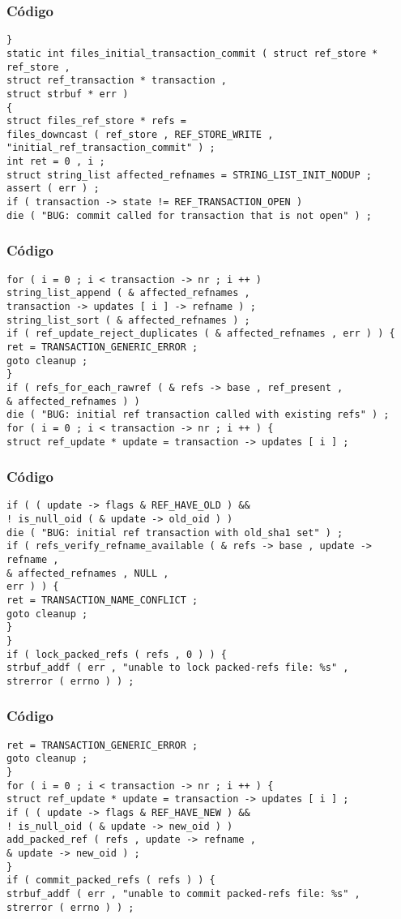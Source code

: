 \documentclass{beamer}
\begin{document}
\begin{frame}[fragile]
\frametitle{C\'odigo}
\begin{verbatim}
} 
static int files_initial_transaction_commit ( struct ref_store * ref_store , 
struct ref_transaction * transaction , 
struct strbuf * err ) 
{ 
struct files_ref_store * refs = 
files_downcast ( ref_store , REF_STORE_WRITE , 
"initial_ref_transaction_commit" ) ; 
int ret = 0 , i ; 
struct string_list affected_refnames = STRING_LIST_INIT_NODUP ; 
assert ( err ) ; 
if ( transaction -> state != REF_TRANSACTION_OPEN ) 
die ( "BUG: commit called for transaction that is not open" ) ; 
\end{verbatim}
\end{frame}
\begin{frame}[fragile]
\frametitle{C\'odigo}
\begin{verbatim}
for ( i = 0 ; i < transaction -> nr ; i ++ ) 
string_list_append ( & affected_refnames , 
transaction -> updates [ i ] -> refname ) ; 
string_list_sort ( & affected_refnames ) ; 
if ( ref_update_reject_duplicates ( & affected_refnames , err ) ) { 
ret = TRANSACTION_GENERIC_ERROR ; 
goto cleanup ; 
} 
if ( refs_for_each_rawref ( & refs -> base , ref_present , 
& affected_refnames ) ) 
die ( "BUG: initial ref transaction called with existing refs" ) ; 
for ( i = 0 ; i < transaction -> nr ; i ++ ) { 
struct ref_update * update = transaction -> updates [ i ] ; 
\end{verbatim}
\end{frame}
\begin{frame}[fragile]
\frametitle{C\'odigo}
\begin{verbatim}
if ( ( update -> flags & REF_HAVE_OLD ) && 
! is_null_oid ( & update -> old_oid ) ) 
die ( "BUG: initial ref transaction with old_sha1 set" ) ; 
if ( refs_verify_refname_available ( & refs -> base , update -> refname , 
& affected_refnames , NULL , 
err ) ) { 
ret = TRANSACTION_NAME_CONFLICT ; 
goto cleanup ; 
} 
} 
if ( lock_packed_refs ( refs , 0 ) ) { 
strbuf_addf ( err , "unable to lock packed-refs file: %s" , 
strerror ( errno ) ) ; 
\end{verbatim}
\end{frame}
\begin{frame}[fragile]
\frametitle{C\'odigo}
\begin{verbatim}
ret = TRANSACTION_GENERIC_ERROR ; 
goto cleanup ; 
} 
for ( i = 0 ; i < transaction -> nr ; i ++ ) { 
struct ref_update * update = transaction -> updates [ i ] ; 
if ( ( update -> flags & REF_HAVE_NEW ) && 
! is_null_oid ( & update -> new_oid ) ) 
add_packed_ref ( refs , update -> refname , 
& update -> new_oid ) ; 
} 
if ( commit_packed_refs ( refs ) ) { 
strbuf_addf ( err , "unable to commit packed-refs file: %s" , 
strerror ( errno ) ) ; 
\end{verbatim}
\end{frame}
\end{document}
